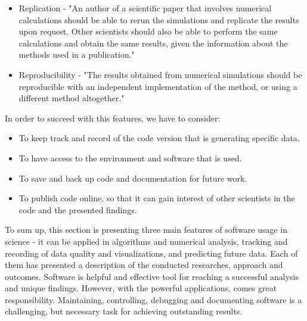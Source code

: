 \begin{itemize}
\item Replication - "An author of a scientific paper that involves numerical calculations should be able to
rerun the simulations and replicate the results upon request. Other scientists should also be able to
perform the same calculations and obtain the same results, given the information about the methods
used in a publication."\cite{johansson2014introduction}
\item Reproducibility - "The results obtained from numerical simulations should be reproducible with an
independent implementation of the method, or using a different method altogether."\cite{johansson2014introduction}
\end{itemize}

In order to succeed with this features, we have to consider:

\begin{itemize}
\item To keep track and record of the code version that is generating specific data.
\item To have access to the environment and software that is used.
\item To save and back up code and documentation for future work.
\item To publish code online, so that it can gain interest of other scientists in the code and the presented findings. \cite{johansson2014introduction}
\end{itemize}


To sum up, this section is presenting three main features of software usage in science - it can be applied in algorithms and numerical analysis, tracking and recording of data quality and visualizations, and predicting future data. Each of them has presented a description of the conducted researches, approach and outcomes. Software is helpful and effective tool for reaching a successful analysis and unique findings. However, with the powerful applications, comes great responsibility. Maintaining, controlling, debugging and documenting software is a challenging, but necessary task for achieving outstanding results. 